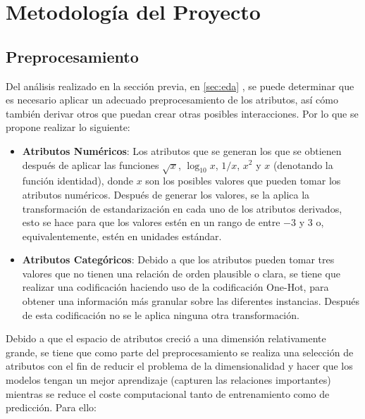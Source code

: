 \documentclass[12pt,a4paper]{article}
\begin{document}
    \section{Metodología del Proyecto}\label{sec:meto}
    {
        \subsection{Preprocesamiento}
        {
            Del análisis realizado en la sección previa, en \ref{sec:eda} , se 
            puede determinar que es necesario aplicar un adecuado preprocesamiento 
            de los atributos, así cómo también derivar otros que puedan crear otras 
            posibles interacciones. Por lo que se propone realizar lo siguiente:

            \begin{itemize}
                \item \textbf{Atributos Numéricos}: Los atributos que se generan los 
                que se obtienen después de aplicar las funciones $\sqrt{x}$, $\log_{10}{x}$, 
                $1/x$, $x^2$ y $x$ (denotando la función identidad), donde $x$ son los posibles 
                valores que pueden tomar los atributos numéricos. Después de generar los valores, 
                se la aplica la transformación de estandarización en cada uno de los atributos 
                derivados, esto se hace para que los valores estén en un rango de entre $-3$ y $3$ 
                o, equivalentemente, estén en unidades estándar.
                \item \textbf{Atributos Categóricos}: Debido a que los atributos pueden tomar 
                tres valores que no tienen una relación de orden plausible o clara, se tiene que 
                realizar una codificación haciendo uso de la codificación One-Hot, para obtener 
                una información más granular sobre las diferentes instancias. Después de esta 
                codificación no se le aplica ninguna otra transformación.
            \end{itemize}

            Debido a que el espacio de atributos creció a una dimensión relativamente grande, se 
            tiene que como parte del preprocesamiento se realiza una selección de atributos con 
            el fin de reducir el problema de la dimensionalidad y hacer que los modelos tengan un 
            mejor aprendizaje (capturen las relaciones importantes) mientras se reduce el coste 
            computacional tanto de entrenamiento como de predicción. Para ello: 

}}
\end{document}
